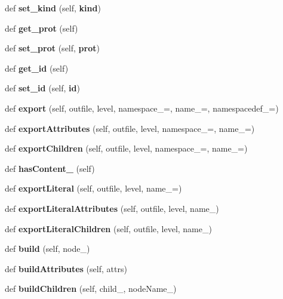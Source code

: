 \begin{DoxyCompactItemize}
\item 
def {\bf set\+\_\+kind} (self, {\bf kind})
\item 
def {\bf get\+\_\+prot} (self)
\item 
def {\bf set\+\_\+prot} (self, {\bf prot})
\item 
def {\bf get\+\_\+id} (self)
\item 
def {\bf set\+\_\+id} (self, {\bf id})
\item 
def {\bf export} (self, outfile, level, namespace\+\_\+=\textquotesingle{}\textquotesingle{}, name\+\_\+=\textquotesingle{}, namespacedef\+\_\+=\textquotesingle{}\textquotesingle{})
\item 
def {\bf export\+Attributes} (self, outfile, level, namespace\+\_\+=\textquotesingle{}\textquotesingle{}, name\+\_\+=\textquotesingle{})
\item 
def {\bf export\+Children} (self, outfile, level, namespace\+\_\+=\textquotesingle{}\textquotesingle{}, name\+\_\+=\textquotesingle{})
\item 
def {\bf has\+Content\+\_\+} (self)
\item 
def {\bf export\+Literal} (self, outfile, level, name\+\_\+=\textquotesingle{})
\item 
def {\bf export\+Literal\+Attributes} (self, outfile, level, name\+\_\+)
\item 
def {\bf export\+Literal\+Children} (self, outfile, level, name\+\_\+)
\item 
def {\bf build} (self, node\+\_\+)
\item 
def {\bf build\+Attributes} (self, attrs)
\item 
def {\bf build\+Children} (self, child\+\_\+, node\+Name\+\_\+)
\end{DoxyCompactItemize}
